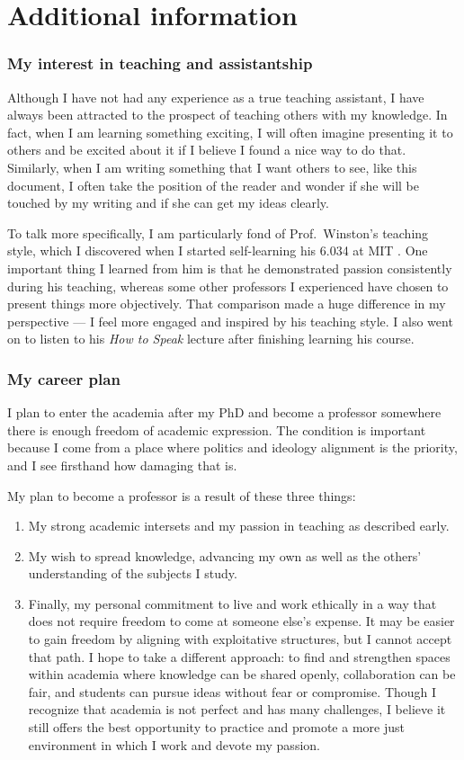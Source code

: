 \part{Additional information}

\section{My interest in teaching and assistantship}
Although I have not had any experience as a true teaching assistant, I have
always been attracted to the prospect of teaching others with my knowledge. In
fact, when I am learning something exciting, I will often imagine presenting it
to others and be excited about it if I believe I found a nice way to do that.
Similarly, when I am writing something that I want others to see, like this
document, I often take the position of the reader and wonder if she will be
touched by my writing and if she can get my ideas clearly.

To talk more specifically, I am particularly fond of Prof.~Winston's teaching
style, which I discovered when I started self-learning his 6.034 at MIT
\cite{winston.ai}. One important thing I learned from him is that he
demonstrated passion consistently during his teaching, whereas some other
professors I experienced have chosen to present things more objectively.  That
comparison made a huge difference in my perspective --- I feel more engaged and
inspired by his teaching style. I also went on to listen to his \emph{How to
Speak} lecture \cite{winston.htspk} after finishing learning his course.

\section{My career plan}
I plan to enter the academia after my PhD and become a professor somewhere
there is enough freedom of academic expression. The condition is important
because I come from a place where politics and ideology alignment is the
priority, and I see firsthand how damaging that is.

My plan to become a professor is a result of these three things:
\begin{enumerate}
\item My strong academic intersets and my passion in teaching as described
	early.
\item My wish to spread knowledge, advancing my own as well as the others'
	understanding of the subjects I study.
\item Finally, my personal commitment to live and work ethically in a way that
	does not require freedom to come at someone else’s expense. It may be
	easier to gain freedom by aligning with exploitative structures, but I
	cannot accept that path. I hope to take a different approach: to find and
	strengthen spaces within academia where knowledge can be shared openly,
	collaboration can be fair, and students can pursue ideas without fear or
	compromise. Though I recognize that academia is not perfect and has many
	challenges, I believe it still offers the best opportunity to practice and
	promote a more just environment in which I work and devote my passion.
\end{enumerate}
